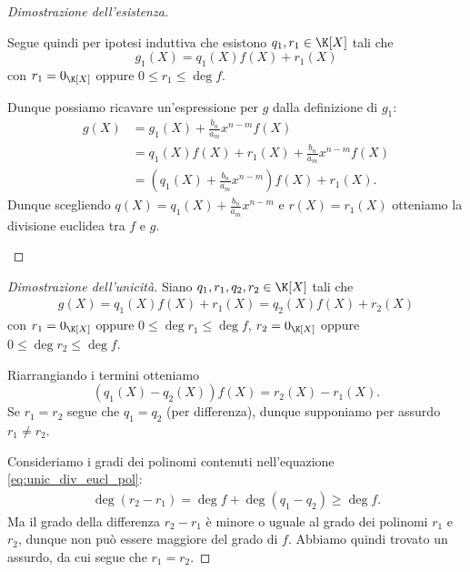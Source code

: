 \begin{proof}[Dimostrazione dell'esistenza]
\begin{description}
        Segue quindi per ipotesi induttiva che esistono $q_1, r_1 \in \K[X]$ tali che \[
            g_1(X) = q_1(X)f(X) + r_1(X)    
        \] con $r_1 = 0_{\K[X]}$ oppure $0 \leq r_1 \leq \deg f$.

        Dunque possiamo ricavare un'espressione per $g$ dalla definizione di $g_1$:
        \begin{align*}
            g(X) &= g_1(X) + \frac{b_n}{a_m}x^{n-m}f(X)\\
            &= q_1(X)f(X) + r_1(X) + \frac{b_n}{a_m}x^{n-m}f(X)\\
            &= (q_1(X) + \frac{b_n}{a_m}x^{n-m})f(X) + r_1(X).
        \end{align*}
        Dunque scegliendo $q(X) = q_1(X) + \frac{b_n}{a_m}x^{n-m}$ e $r(X) = r_1(X)$ otteniamo la divisione euclidea tra $f$ e $g$.
    \end{description}
\end{proof}
\begin{proof}[Dimostrazione dell'unicità]
    Siano $q_1, r_1, q_2, r_2 \in \K[X]$ tali che \begin{align*}
        g(X) = q_1(X)f(X) + r_1(X) = q_2(X)f(X) + r_2(X)
    \end{align*} con $r_1 = 0_{\K[X]}$ oppure $0 \leq \deg r_1 \leq \deg f$, $r_2 = 0_{\K[X]}$ oppure $0 \leq \deg r_2 \leq \deg f$.

    Riarrangiando i termini otteniamo \begin{equation}
        (q_1(X) - q_2(X))f(X) = r_2(X) - r_1(X).    \label{eq:unic_div_eucl_pol}
    \end{equation} Se $r_1 = r_2$ segue che $q_1 = q_2$ (per differenza), dunque supponiamo per assurdo $r_1 \neq r_2$. 
    
    Consideriamo i gradi dei polinomi contenuti nell'equazione \eqref{eq:unic_div_eucl_pol}: \begin{align*}
        \deg (r_2 - r_1) = \deg f + \deg (q_1 - q_2) \geq \deg f.
    \end{align*} Ma il grado della differenza $r_2 - r_1$ è minore o uguale al grado dei polinomi $r_1$ e $r_2$, dunque non può essere maggiore del grado di $f$. Abbiamo quindi trovato un assurdo, da cui segue che $r_1 = r_2$.
\end{proof}

